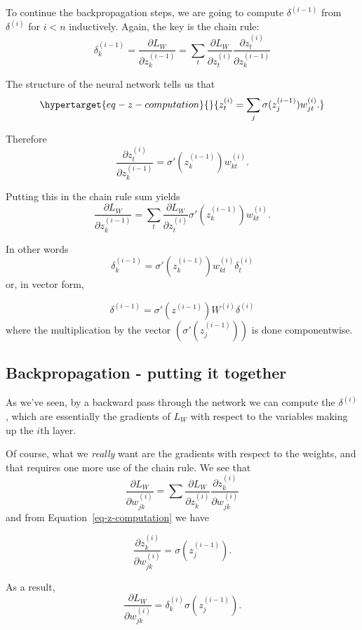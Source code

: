 \documentclass[
  11pt,
  letterpaper,
]{scrbook}
\theoremstyle{plain}
\theoremstyle{remark}
\begin{document}
To continue the backpropagation steps, we are going to compute
\(\delta^{(i-1)}\) from \(\delta^{(i)}\) for \(i<n\) inductively. Again,
the key is the chain rule: \[
\delta^{(i-1)}_k = \frac{\partial L_{W}}{\partial z^{(i-1)}_{k}} = \sum_{t}\frac{\partial L_{W}}{\partial z^{(i)}_{t}}\frac{\partial z^{(i)}_{t}}{\partial z^{(i-1)}_{k}}
\]

The structure of the neural network tells us that
\begin{equation}\protect\hypertarget{eq-z-computation}{}{
z_{t}^{(i)} = \sum_{j} \sigma(z_{j}^{(i-1)})w_{jt}^{(i)}.
}\label{eq-z-computation}\end{equation}

Therefore \[
\frac{\partial z^{(i)}_{t}}{\partial z^{(i-1)}_{k}}= \sigma'(z_{k}^{(i-1)})w_{kt}^{(i)}.
\]

Putting this in the chain rule sum yields \[
\frac{\partial L_{W}}{\partial z^{(i-1)}_{k}} = \sum_{t}\frac{\partial L_{W}}{\partial z^{(i)}_{t}}\sigma'(z_{k}^{(i-1)})w_{kt}^{(i)}.
\]

In other words \[
\delta^{(i-1)}_{k} = \sigma'(z_{k}^{(i-1)})w_{kt}^{(i)}\delta^{(i)}_{t}
\] or, in vector form,

\[
\delta^{(i-1)} = \sigma'(z^{(i-1)})W^{(i)}\delta^{(i)}
\] where the multiplication by the vector \((\sigma'(z^{(i-1)}_{j}))\)
is done componentwise.

\hypertarget{backpropagation---putting-it-together}{%
\subsection{Backpropagation - putting it
together}\label{backpropagation---putting-it-together}}

As we've seen, by a backward pass through the network we can compute the
\(\delta^{(i)}\), which are essentially the gradients of \(L_{W}\) with
respect to the variables making up the \(i\)th layer.

Of course, what we \emph{really} want are the gradients with respect to
the weights, and that requires one more use of the chain rule. We see
that \[
\frac{\partial L_{W}}{\partial w^{(i)}_{jk}} = \sum \frac{\partial L_{W}}{\partial z^{(i)}_{k}}\frac{\partial z^{(i)}_{k}}{\partial w^{(i)}_{jk}}
\] and from Equation~\ref{eq-z-computation} we have

\[
\frac{\partial z^{(i)}_{k}}{\partial w^{(i)}_{jk}} = \sigma(z^{(i-1)}_{j}).
\]

As a result, \[
\frac{\partial L_{W}}{\partial w^{(i)}_{jk}} =  \delta^{(i)}_{k}\sigma(z^{(i-1)}_{j}).
\]
\end{document}
